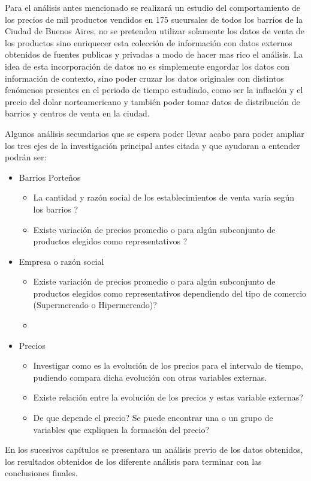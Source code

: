 

Para el análisis antes mencionado se realizará un estudio del comportamiento de los precios de mil productos vendidos en 175 sucursales de todos los barrios de la Ciudad de Buenos Aires, no se pretenden utilizar solamente los datos de venta de los productos sino enriquecer esta colección de información con datos externos obtenidos de fuentes publicas y privadas a modo de hacer mas rico el análisis. La idea de esta incorporación de datos no es simplemente engordar los datos con información de contexto, sino poder cruzar los datos originales con distintos fenómenos presentes en el periodo de tiempo estudiado, como ser la inflación y el precio del dolar norteamericano y también poder tomar datos de distribución de barrios y centros de venta en la ciudad.

Algunos análisis secundarios que se espera poder llevar acabo para poder ampliar los tres ejes de la investigación principal antes citada y que ayudaran a entender podrán ser:


\begin{itemize}
	\item Barrios Porteños
    \begin{itemize}
    	\item La cantidad y razón social de los establecimientos de venta varia según los barrios ?
        \item Existe variación de precios promedio o para algún subconjunto de productos elegidos como representativos ?
    \end{itemize}
    \item Empresa o razón social
    \begin{itemize}
    	\item  Existe variación de precios promedio o para algún subconjunto de productos elegidos como representativos dependiendo del tipo de comercio (Supermercado o Hipermercado)?
    	\item
    \end{itemize}
    \item Precios
    \begin{itemize}
    	\item  Investigar como es la evolución de los precios para el intervalo de tiempo, pudiendo compara dicha evolución con otras variables externas.
    	\item Existe relación entre la evolución de los precios y estas variable externas?
    	\item De que depende el precio? Se puede encontrar una o un grupo de variables que expliquen la formación del precio?
    \end{itemize}
\end{itemize}


En los sucesivos capítulos se presentara un análisis previo de los datos obtenidos, los resultados obtenidos de los diferente análisis para terminar con las conclusiones finales.

